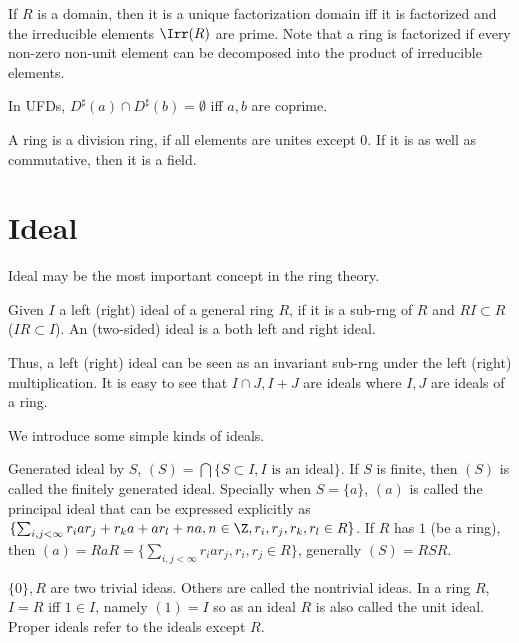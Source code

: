 \documentclass[11pt,a4paper,fleqn]{article}
\begin{document}
\begin{lemma}
  If $R$ is a domain, then it is a unique factorization domain iff it is factorized and the irreducible elements $\Irr(R)$ are prime. Note that a ring is factorized if every non-zero non-unit element can be decomposed into the product of irreducible elements.
\end{lemma}

\begin{lemma}
In UFDs, $D^\sharp(a)\cap D^\sharp(b)=\emptyset$ iff $a,b$ are coprime.
\end{lemma}

\begin{definition}A ring is a division ring, if all elements are unites except $0$. If it is as well as commutative, then it is a field.
\end{definition}

\section{Ideal}
Ideal may be the most important concept in the ring theory.
\begin{definition}[Ideal]
Given $I$ a left (right) ideal of a general ring $R$, if it is a sub-rng of $R$ and $RI\subset R$ ($IR\subset I$). An (two-sided) ideal is a both left and right ideal.
\end{definition}

Thus, a left (right) ideal can be seen as an invariant sub-rng under the left (right) multiplication. It is easy to see that $I\cap J, I+J$ are ideals where $I, J$ are ideals of a ring.

We introduce some simple kinds of ideals.
\begin{definition}
Generated ideal by $S$, $(S)=\bigcap\{S\subset I,I \text{ is an ideal}\}$. If $S$ is finite, then $(S)$ is called the finitely generated ideal. Specially when $S=\{a\}$, $(a)$ is called the principal ideal that can be expressed explicitly as $\{\sum_{i,j<\infty}r_iar_j+r_ka+ar_l+na,n\in\Z,r_i,r_j,r_k,r_l\in R\}$. If $R$ has $1$ (be a ring), then $(a)=RaR=\{\sum_{i,j<\infty}r_iar_j,r_i,r_j\in R\}$, generally $(S)=RSR$.
\end{definition}
$\{0\},R$ are two trivial ideas. Others are called the nontrivial ideas. In a ring $R$, $I=R$ iff $1\in I$, namely $(1)=I$ so as an ideal $R$ is also called the unit ideal. Proper ideals refer to the ideals except $R$.
\end{document}
